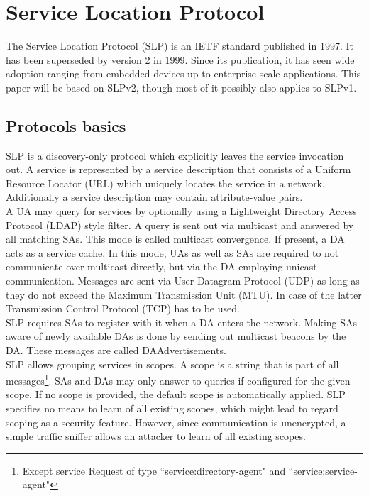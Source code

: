 \section{Service Location Protocol}\label{sec:slp-overview}
The Service Location Protocol (SLP) is an IETF standard published in 1997. It has been superseded by version 2 \citep{Guttman1999} in 1999. Since its publication, it has seen wide adoption ranging from embedded devices up to enterprise scale applications. This paper will be based on SLPv2, though most of it possibly also applies to SLPv1.

\subsection{Protocols basics\label{sub:Protocols-basics}}
SLP is a discovery-only protocol which explicitly leaves the service invocation out. A service is represented by a service description that consists of a Uniform Resource Locator (URL) \citep{Berners-Lee1994} which uniquely locates the service in a network. Additionally a service description may contain attribute-value pairs.\\
A UA may query for services by optionally using a Lightweight Directory Access Protocol (LDAP) \citep{Howes1997} style filter. A query is sent out via multicast \citep{Armstrong1992} and answered by all matching SAs. This mode is called multicast convergence. If present, a DA acts as a service cache. In this mode, UAs as well as SAs are required to not communicate over multicast directly, but via the DA employing unicast communication. Messages are sent via User Datagram Protocol (UDP) as long as they do not exceed the Maximum Transmission Unit (MTU). In case of the latter Transmission Control Protocol (TCP) has to be used.\\
SLP requires SAs to register with it when a DA enters the network. Making SAs aware of newly available DAs is done by sending out multicast beacons by the DA. These messages are called DAAdvertisements.\\
SLP allows grouping services in scopes. A scope is a string that is part of all messages\footnote{Except service Request of type ``service:directory-agent" and ``service:service-agent"}. SAs and DAs may only answer to queries if configured for the given scope. If no scope is provided, the default scope is automatically applied. SLP specifies no means to learn of all existing scopes, which might lead to regard scoping as a security feature. However, since communication is unencrypted, a simple traffic sniffer allows an attacker to learn of all existing scopes.

